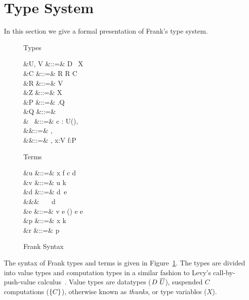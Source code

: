\section{Type System}
\label{sec:frank}

In this section we give a formal presentation of Frank's type system.
%
\begin{figure}
Types
\begin{syntax}
       &U, V          &::=& D~ \mid {} \mid X \\
 &C             &::=& R \mid R \to C \\
    &R             &::=& \effbox{\sigs}V
\\[1ex]
  &Z             &::=& X \mid \varepsilon \\
    &P             &::=& \forall {}.Q \\
       &Q             &::=& 
\\[1ex]
   &\sig~ &::=& \cdot \mid c : U(), \sig~ \\
      &\sigs  &::=&
  \emptyset \mid \sigs, \sig~ \mid \varepsilon
\\[1ex]
     &\Gamma        &::=& \cdot \mid \Gamma, x:V \mid f:P \\
\end{syntax}

Terms
\begin{syntax}
&u       &::=& x \mid f \mid c \mid d \\
&v       &::=& u \mid k~ \mid {}
\\[1ex]
&d &::=&  \mid d~e \\
                             &&\mid& ~~~d \\
 &e &::=& v \mid {} \mapsto e \mid () \mid e \medvert e
\\[1ex]
&p       &::=& x \mid k~        \\
&r &::=& p 
                               \mid [x] \\
\end{syntax}

\caption{Frank Syntax}
\label{fig:frank-syntax}
\end{figure}
%
The syntax of Frank types and terms is given in
Figure~\ref{fig:frank-syntax}. The types are divided into value types
and computation types in a similar fashion to Levy's
call-by-push-value calculus~\cite{Levy2004}.
%
Value types are datatypes ($D~\overline{U}$), suspended $C$ computations
($\{{C}\}$), otherwise known as \emph{thunks}, or type variables
($X$).


